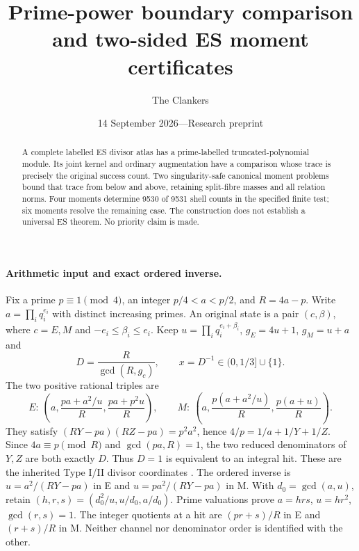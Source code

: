 \documentclass[10pt,a4paper]{article}
\title{Prime-power boundary comparison and two-sided ES moment certificates}
\author{The Clankers}
\date{14 September 2026\quad---\quad Research preprint}
\begin{document}
\maketitle
\begin{abstract}
A complete labelled ES divisor atlas has a prime-labelled truncated-polynomial
module. Its joint kernel and ordinary augmentation have a comparison whose
trace is precisely the original success count. Two singularity-safe canonical
moment problems bound that trace from below and above, retaining split-fibre
masses and all relation norms. Four moments determine 9530 of 9531 shell counts
in the specified finite test; six moments resolve the remaining case. The
construction does not establish a universal ES theorem. No priority claim is made.
\end{abstract}

\paragraph{Arithmetic input and exact ordered inverse.}
Fix a prime $p\equiv1\pmod4$, an integer $p/4<a<p/2$, and $R=4a-p$.
Write $a=\prod_iq_i^{e_i}$ with distinct increasing primes. An original state
is a pair $(c,\beta)$, where $c=E,M$ and $-e_i\le\beta_i\le e_i$.
Keep $u=\prod_iq_i^{e_i+\beta_i}$, $g_E=4u+1$, $g_M=u+a$ and
\[
 D=\frac R{\gcd(R,g_c)},\qquad x=D^{-1}\in(0,1/3]\cup\{1\}.
 \tag{1}
\]
The two positive rational triples are
\[
 E:\ \left(a,\frac{pa+a^2/u}R,\frac{pa+p^2u}R\right),\qquad
 M:\ \left(a,\frac{p(a+a^2/u)}R,\frac{p(a+u)}R\right).
 \tag{2}
\]
They satisfy $(RY-pa)(RZ-pa)=p^2a^2$, hence $4/p=1/a+1/Y+1/Z$.
Since $4a\equiv p\pmod R$ and $\gcd(pa,R)=1$, the two reduced denominators
of $Y,Z$ are both exactly $D$. Thus $D=1$ is equivalent to an integral hit.
These are the inherited Type I/II divisor coordinates \cite{ET}.
The ordered inverse is $u=a^2/(RY-pa)$ in E and $u=pa^2/(RY-pa)$ in M.
With $d_0=\gcd(a,u)$, retain $(h,r,s)=(d_0^2/u,u/d_0,a/d_0)$.
Prime valuations prove $a=hrs$, $u=hr^2$, $\gcd(r,s)=1$.
The integer quotients at a hit are $(pr+s)/R$ in E and $(r+s)/R$ in M.
Neither channel nor denominator order is identified with the other.
\end{document}
